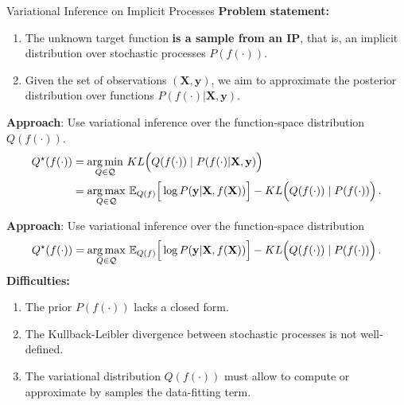     \begin{frame}{Variational Inference on Implicit Processes}
    \textbf{Problem statement:}
        \begin{enumerate}
            \item The unknown target function \textbf{is a sample from an IP}, that is, an implicit distribution over stochastic processes \(P(f(\cdot))\).
            \item Given the set of observations \((\mathbf X, \mathbf y)\), we aim to approximate the posterior distribution over functions \(P(f(\cdot)| \mathbf X, \mathbf y)\).
        \end{enumerate}
        \textbf{Approach}: Use variational inference over the function-space distribution \(Q(f(\cdot))\).
        \[
        \begin{aligned}
        Q^\star(f(\cdot))&= \operatorname*{arg\,min}_{Q \in \mathcal{Q}}\, KL\Big(Q(f(\cdot))  \mid P( f(\cdot) | \mathbf X, \mathbf y)\Big)\\
        &= \operatorname*{arg\,max}_{Q \in \mathcal{Q}} \,\mathbb{E}_{Q(f)}\Big[ \log P(\mathbf y | \mathbf X, f(\mathbf X)) \Big] - KL\Big(Q(f(\cdot)) \mid P(f(\cdot)) \Big)\,.
        \end{aligned}
        \]
    \end{frame}
    \begin{frame}
        \textbf{Approach}: Use variational inference over the function-space distribution
        \[
            Q^\star(f(\cdot)) = \operatorname*{arg\,max}_{Q \in \mathcal{Q}} \,\mathbb{E}_{Q(f)}\Big[ \log P(\mathbf y | \mathbf X, f(\mathbf X)) \Big] - KL\Big(Q(f(\cdot)) \mid P(f(\cdot)) \Big)\,.
        \]
        \textbf{Difficulties:}
        \begin{enumerate}
            \item The prior \(P(f(\cdot))\) lacks a closed form.
            \item The Kullback-Leibler divergence between stochastic processes is not well-defined.
            \item The variational distribution \(Q(f(\cdot))\) must allow to compute or approximate by samples the data-fitting term.
        \end{enumerate}
    \end{frame}


